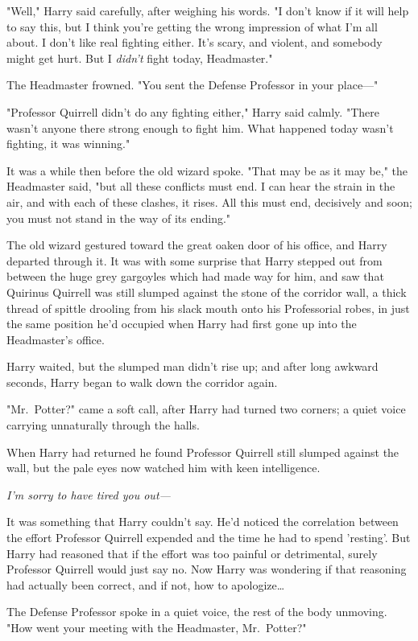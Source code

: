 "Well," Harry said carefully, after weighing his words. "I don't know if it 
will help to say this, but I think you're getting the wrong impression of what 
I'm all about. I don't like real fighting either. It's scary, and violent, and 
somebody might get hurt. But I \emph{didn't} fight today, Headmaster."

The Headmaster frowned. "You sent the Defense Professor in your place---"

"Professor Quirrell didn't do any fighting either," Harry said calmly. "There 
wasn't anyone there strong enough to fight him. What happened today wasn't 
fighting, it was winning."

It was a while then before the old wizard spoke. "That may be as it may be," 
the Headmaster said, "but all these conflicts must end. I can hear the strain 
in the air, and with each of these clashes, it rises. All this must end, 
decisively and soon; you must not stand in the way of its ending."

The old wizard gestured toward the great oaken door of his office, and Harry 
departed through it.
\sbreak
It was with some surprise that Harry stepped out from between the huge grey 
gargoyles which had made way for him, and saw that Quirinus Quirrell was still 
slumped against the stone of the corridor wall, a thick thread of spittle 
drooling from his slack mouth onto his Professorial robes, in just the same 
position he'd occupied when Harry had first gone up into the Headmaster's 
office.

Harry waited, but the slumped man didn't rise up; and after long awkward 
seconds, Harry began to walk down the corridor again.

"Mr.~Potter?" came a soft call, after Harry had turned two corners; a quiet 
voice carrying unnaturally through the halls.

When Harry had returned he found Professor Quirrell still slumped against the 
wall, but the pale eyes now watched him with keen intelligence.

\emph{I'm sorry to have tired you out---}

It was something that Harry couldn't say. He'd noticed the correlation between 
the effort Professor Quirrell expended and the time he had to spend 'resting'. 
But Harry had reasoned that if the effort was too painful or detrimental, 
surely Professor Quirrell would just say no. Now Harry was wondering if that 
reasoning had actually been correct, and if not, how to apologize{\ldots}

The Defense Professor spoke in a quiet voice, the rest of the body unmoving. 
"How went your meeting with the Headmaster, Mr.~Potter?"


